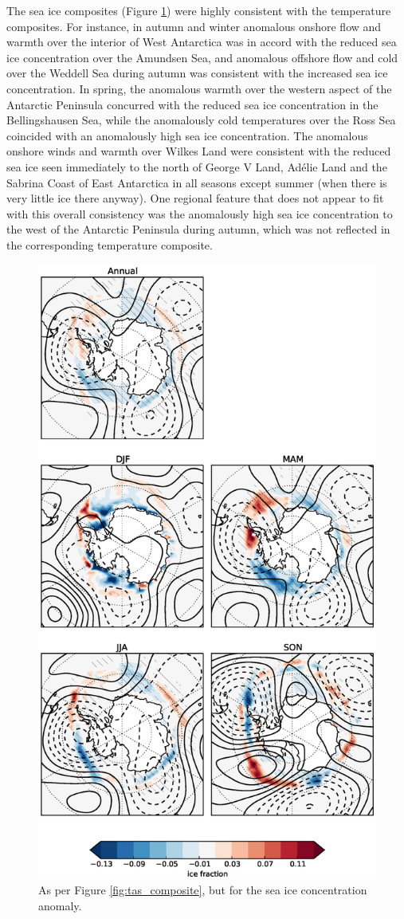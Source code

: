 The sea ice composites (Figure \ref{fig:sic_composite}) were highly consistent with the temperature composites. For instance, in autumn and winter anomalous onshore flow and warmth over the interior of West Antarctica was in accord with the reduced sea ice concentration over the Amundsen Sea, and anomalous offshore flow and cold over the Weddell Sea during autumn was consistent with the increased sea ice concentration. In spring, the anomalous warmth over the western aspect of the Antarctic Peninsula concurred with the reduced sea ice concentration in the Bellingshausen Sea, while the anomalously cold temperatures over the Ross Sea coincided with an anomalously high sea ice concentration. The anomalous onshore winds and warmth over Wilkes Land were consistent with the reduced sea ice seen immediately to the north of George V Land, Ad{\'e}lie Land and the Sabrina Coast of East Antarctica in all seasons except summer (when there is very little ice there anyway). One regional feature that does not appear to fit with this overall consistency was the anomalously high sea ice concentration to the west of the Antarctic Peninsula during autumn, which was not reflected in the corresponding temperature composite.
 
\begin{figure}
\begin{center}
\includegraphics[width=0.63\columnwidth]{figures/zonalwaves/sic-composite_pwigt90pct_ERAInterim_500hPa_030day-runmean-anom-wrt-all_native-shextropics15.eps}
\caption{\label{fig:sic_composite}
As per Figure \ref{fig:tas_composite}, but for the sea ice concentration anomaly.}
\end{center}
\end{figure}    
 

